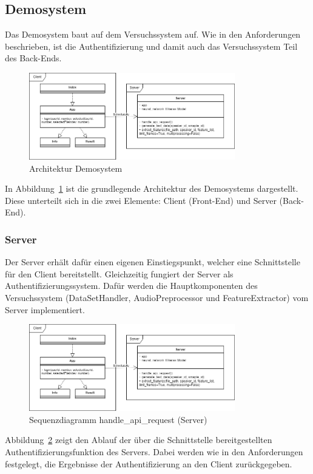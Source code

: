 \subsection{Demosystem}
Das Demosystem baut auf dem Versuchssystem auf.
Wie in den Anforderungen beschrieben, ist die Authentifizierung und damit auch das Versuchssystem Teil des Back-Ends.
\begin{figure}
    \centering
    \includegraphics[width=0.8\textwidth, keepaspectratio]{images/Architektur-Demosystem.png}
    \caption{Architektur Demosystem}
    \label{fig:ArchitectureDemoSystem}
\end{figure}
In Abbildung~\ref{fig:ArchitectureDemoSystem} ist die grundlegende Architektur des Demosystems dargestellt.
Diese unterteilt sich in die zwei Elemente: Client (Front-End) und Server (Back-End).

\subsubsection{Server}
Der Server erhält dafür einen eigenen Einstiegspunkt, welcher eine Schnittstelle für den Client bereitstellt.
Gleichzeitig fungiert der Server als Authentifizierungssystem.
Dafür werden die Hauptkomponenten des Versuchssystem (DataSetHandler, AudioPreprocessor und FeatureExtractor) vom Server implementiert.

\begin{figure}
    \centering
    \includegraphics[width=0.8\textwidth, keepaspectratio]{images/Architektur-Demosystem.png} %
    \caption{Sequenzdiagramm handle\_api\_request (Server)}
    \label{fig:SequenceHandleApiRequest}
\end{figure}
Abbildung~\ref{fig:SequenceHandleApiRequest} zeigt den Ablauf der über die Schnittstelle bereitgestellten Authentifizierungsfunktion des Servers.
Dabei werden wie in den Anforderungen festgelegt, die Ergebnisse der Authentifizierung an den Client zurückgegeben.

